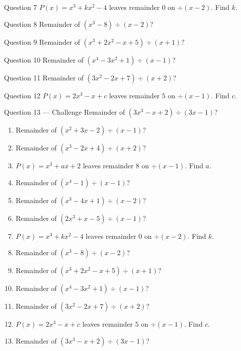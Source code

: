 \documentclass[11pt]{article}
\begin{document}
\begin{qbox}{Question 7}
$P(x)=x^3+kx^2-4$ leaves remainder $0$ on $\div(x-2)$. Find $k$.\workspace{2.4cm}
\end{qbox}

\begin{qbox}{Question 8}
Remainder of $(x^3-8)\div(x-2)$?\workspace{2.4cm}
\end{qbox}

\begin{qbox}{Question 9}
Remainder of $(x^3+2x^2-x+5)\div(x+1)$?\workspace{2.4cm}
\end{qbox}

\begin{qbox}{Question 10}
Remainder of $(x^4-3x^2+1)\div(x-1)$?\workspace{2.4cm}
\end{qbox}

\begin{qbox}{Question 11}
Remainder of $(3x^2-2x+7)\div(x+2)$?\workspace{2.4cm}
\end{qbox}

\begin{qbox}{Question 12}
$P(x)=2x^3-x+c$ leaves remainder $5$ on $\div(x-1)$. Find $c$.\workspace{2.4cm}
\end{qbox}

\begin{qbox}{Question 13 --- Challenge}
Remainder of $(3x^3-x+2)\div(3x-1)$?\workspace{3cm}
\end{qbox}

\clearpage
{}

\begin{recapbox}
\begin{multicols}{2}
\small
\begin{enumerate}[leftmargin=*,itemsep=3pt]
  \item Remainder of $(x^2+3x-2)\div(x-1)$?
  \item Remainder of $(x^3-2x+4)\div(x+2)$?
  \item $P(x)=x^3+ax+2$ leaves remainder $8$ on $\div(x-1)$. Find $a$.
  \item Remainder of $(x^4-1)\div(x-1)$?
  \item Remainder of $(x^3-4x+1)\div(x-2)$?
  \item Remainder of $(2x^3+x-5)\div(x-1)$?
  \item $P(x)=x^3+kx^2-4$ leaves remainder $0$ on $\div(x-2)$. Find $k$.
  \item Remainder of $(x^3-8)\div(x-2)$?
  \item Remainder of $(x^3+2x^2-x+5)\div(x+1)$?
  \item Remainder of $(x^4-3x^2+1)\div(x-1)$?
  \item Remainder of $(3x^2-2x+7)\div(x+2)$?
  \item $P(x)=2x^3-x+c$ leaves remainder $5$ on $\div(x-1)$. Find $c$.
  \item Remainder of $(3x^3-x+2)\div(3x-1)$?
\end{enumerate}
\end{multicols}
\end{recapbox}
\end{document}
